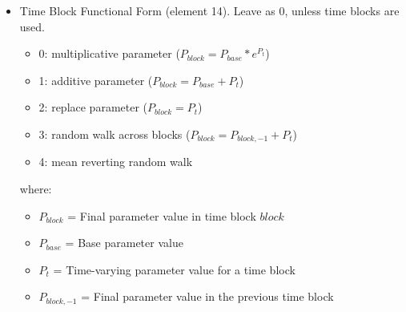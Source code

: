 \begin{itemize}
\item Time Block Functional Form (element 14). Leave as 0, unless time blocks are used.
	\begin{itemize}
		\item 0: multiplicative parameter ($P_{block} = P_{base}*e^{P_t}$)
		\item 1: additive parameter ($P_{block} = P_{base} + P_t$)
		\item 2: replace parameter ($P_{block} = P_t$)
		\item 3: random walk across blocks ($P_{block} = P_{block,-1} + P_t$)
		\item 4: mean reverting random walk
	\end{itemize}
	where:
	\begin{itemize}
        \item $P_{block}$ = Final parameter value in time block $block$
        \item $P_{base}$ = Base parameter value
		\item $P_{t}$ = Time-varying parameter value for a time block
		\item $P_{block,-1}$ = Final parameter value in the previous time block
     \end{itemize}
\end{itemize}



	 
